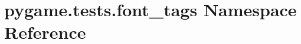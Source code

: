 \hypertarget{namespacepygame_1_1tests_1_1font__tags}{}\section{pygame.\+tests.\+font\+\_\+tags Namespace Reference}
\label{namespacepygame_1_1tests_1_1font__tags}
